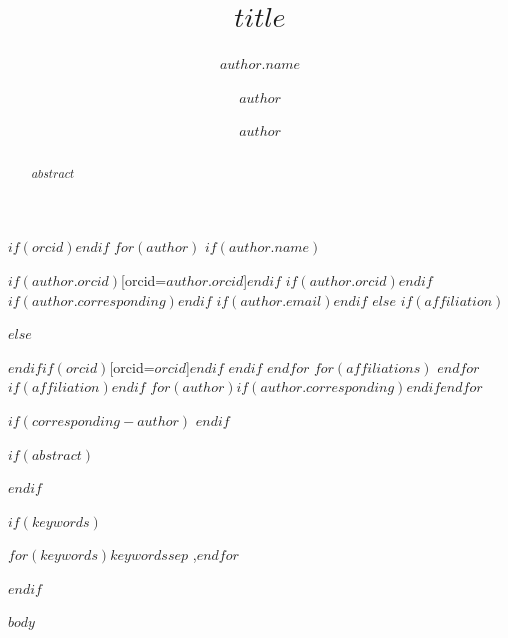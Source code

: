 \documentclass[a4paper,fleqn]{cas-dc}
\begin{document}
\let\WriteBookmarks\relax
\def\floatpagepagefraction{1}
\def\textpagefraction{.001}


\title[mode=title]{$title$}

\newif\ifhasauthororcid
$if(orcid)$\hasauthororcidtrue$endif$
$for(author)$
$if(author.name)$
\author[$author.affiliation$]{$author.name$}$if(author.orcid)$[orcid=$author.orcid$]$endif$
$if(author.orcid)$\hasauthororcidtrue$endif$
$if(author.corresponding)$\cormark[1]$endif$
$if(author.email)$$endif$
$else$
$if(affiliation)$\author[1]{$author$}$else$\author{$author$}$endif$$if(orcid)$[orcid=$orcid$]$endif$
$endif$
$endfor$
$for(affiliations)$
$endfor$
$if(affiliation)$$endif$
$for(author)$$if(author.corresponding)$$endif$$endfor$
\ifhasauthororcid\else\renewcommand{\printorcid}{}\fi
$if(corresponding-author)$
\cormark[1]
$endif$

$if(abstract)$
\begin{abstract}
$abstract$
\end{abstract}
$endif$

$if(keywords)$
\begin{keywords}
$for(keywords)$$keywords$$sep$ \sep $endfor$
\end{keywords}
$endif$

\maketitle

$body$

\clearpage
\addtocounter{page}{-1}
\end{document}
